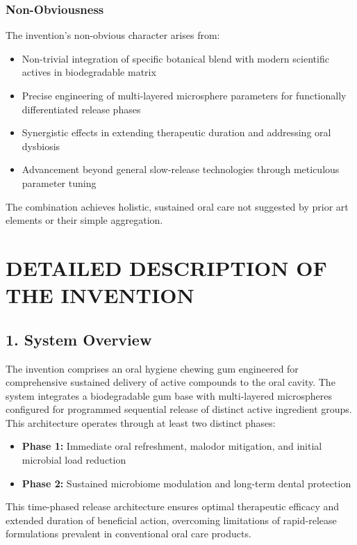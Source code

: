 \documentclass[12pt]{article}
\begin{document}
\subsubsection*{Non-Obviousness}
The invention's non-obvious character arises from:
\begin{itemize}
    \item Non-trivial integration of specific botanical blend with modern scientific actives in biodegradable matrix
    \item Precise engineering of multi-layered microsphere parameters for functionally differentiated release phases
    \item Synergistic effects in extending therapeutic duration and addressing oral dysbiosis
    \item Advancement beyond general slow-release technologies through meticulous parameter tuning
\end{itemize}

The combination achieves holistic, sustained oral care not suggested by prior art elements or their simple aggregation.

\section*{DETAILED DESCRIPTION OF THE INVENTION}

\subsection*{1. System Overview}
The invention comprises an oral hygiene chewing gum engineered for comprehensive sustained delivery of active compounds to the oral cavity. The system integrates a biodegradable gum base with multi-layered microspheres configured for programmed sequential release of distinct active ingredient groups. This architecture operates through at least two distinct phases:

\begin{itemize}
    \item \textbf{Phase 1:} Immediate oral refreshment, malodor mitigation, and initial microbial load reduction
    \item \textbf{Phase 2:} Sustained microbiome modulation and long-term dental protection
\end{itemize}

This time-phased release architecture ensures optimal therapeutic efficacy and extended duration of beneficial action, overcoming limitations of rapid-release formulations prevalent in conventional oral care products.
\end{document}
